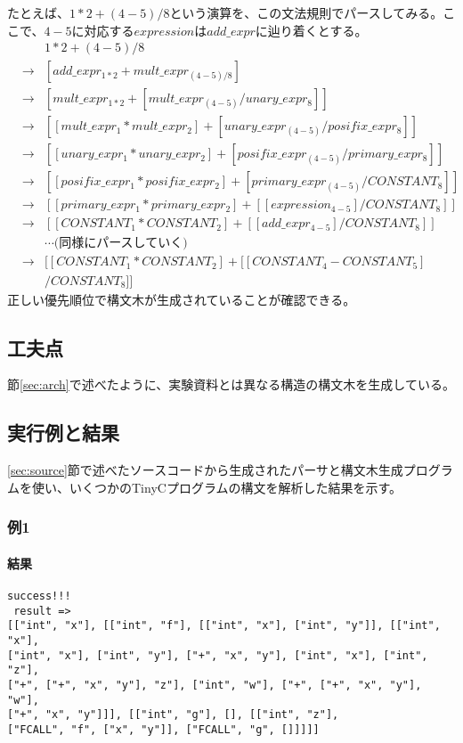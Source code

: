\documentclass[titlepage, a4paper,12pt]{jarticle}
\begin{document}
たとえば、$1*2+(4-5)/8$という演算を、この文法規則でパースしてみる。ここで、$4-5$に対応する$expression$は$add\_expr$に辿り着くとする。
\begin{eqnarray}
  &    & 1*2+(4-5)/8 \nonumber \\
  & \to & [add\_expr_{1*2} + mult\_expr_{(4-5)/8}] \nonumber \\
  & \to & [mult\_expr_{1*2} + [mult\_expr_{(4-5)} / unary\_expr_{8}]] \nonumber \\
  & \to & [[mult\_expr_{1} * mult\_expr_{2}] + [unary\_expr_{(4-5)} / posifix\_expr_{8}]] \nonumber \\
  & \to & [[unary\_expr_{1} * unary\_expr_{2}] + [posifix\_expr_{(4-5)} / primary\_expr_{8}]] \nonumber \\
  & \to & [[posifix\_expr_{1} * posifix\_expr_{2}] + [primary\_expr_{(4-5)} / CONSTANT_{8}]] \nonumber \\
  & \to & [[primary\_expr_{1} * primary\_expr_{2}] + [[expression_{4-5}] / CONSTANT_{8}]] \nonumber \\
  & \to & [[CONSTANT_{1} * CONSTANT_{2}] + [[add\_expr_{4-5}] / CONSTANT_{8}]] \nonumber \\
  &     & \cdots \mbox{(同様にパースしていく)} \nonumber \\
  & \to & [[CONSTANT_{1} * CONSTANT_{2}] + [[CONSTANT_{4} - CONSTANT_{5}] \nonumber \\
  &     & / CONSTANT_{8}]] \nonumber
\end{eqnarray}
正しい優先順位で構文木が生成されていることが確認できる。
\subsection{工夫点}
節\ref{sec:arch}で述べたように、実験資料とは異なる構造の構文木を生成している。
\subsection{実行例と結果}
\ref{sec:source}節で述べたソースコードから生成されたパーサと構文木生成プログラムを使い、いくつかのTinyCプログラムの構文を解析した結果を示す。
\subsubsection{例1}

\paragraph{結果}
\begin{verbatim}
success!!! 
 result => 
[["int", "x"], [["int", "f"], [["int", "x"], ["int", "y"]], [["int", "x"],
["int", "x"], ["int", "y"], ["+", "x", "y"], ["int", "x"], ["int", "z"], 
["+", ["+", "x", "y"], "z"], ["int", "w"], ["+", ["+", "x", "y"], "w"], 
["+", "x", "y"]]], [["int", "g"], [], [["int", "z"], 
["FCALL", "f", ["x", "y"]], ["FCALL", "g", []]]]]
\end{verbatim}
\end{document}
